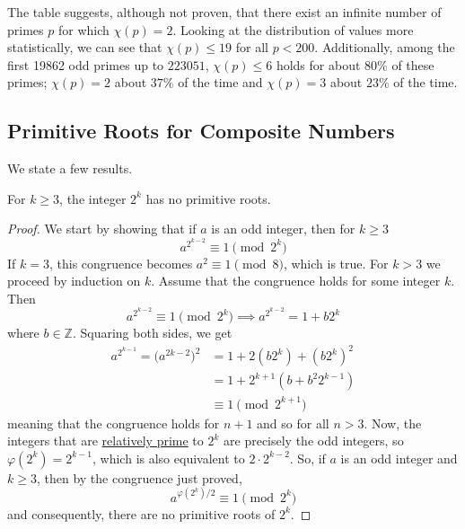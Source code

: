 \documentclass{article}
\newcounter{theorem}[section]
\begin{document}
The table suggests, although not proven, that there exist an infinite number of primes $p$ for which $\chi(p) = 2$. Looking at the distribution of values more statistically, we can see that $\chi(p) \leq 19$ for all $p < 200$. Additionally, among the first 19862 odd primes up to $223051$, $\chi(p) \leq 6$ holds for about $80\%$ of these primes; $\chi(p) = 2$ about $37\%$ of the time and $\chi(p) = 3$ about $23\%$ of the time. 

\subsection{Primitive Roots for Composite Numbers}
We state a few results. 

\begin{theorem}
  \label{thm:2k-has-no-primitive-roots-for-kgeq3}
For $k\geq 3$, the integer $2^k$ has no primitive roots. 
\end{theorem}
\begin{proof}
We start by showing that if $a$ is an odd integer, then for $k\geq 3$ 
\begin{equation}
  a^{2^{k-2}} \equiv 1 \pmod{2^k}
\end{equation}
If $k=3$, this congruence becomes $a^2 \equiv 1 \pmod{8}$, which is true. For $k > 3$ we proceed by induction on $k$. Assume that the congruence holds for some integer $k$. Then 
\begin{equation}
  a^{2^{k-2}} \equiv 1 \pmod{2^k} \implies a^{2^{k-2}} = 1 + b 2^k
\end{equation}
where $b \in \mathbb{Z}$. Squaring both sides, we get
\begin{align*}
    a^{2^{k-1}} = \big(a^{2k-2}\big)^2 & = 1 + 2(b 2^k) + (b2^k)^2 \\
    & = 1 + 2^{k+1} (b + b^2 2^{k-1}) \\
    & \equiv 1 \pmod{2^{k+1}}
\end{align*}
meaning that the congruence holds for $n+1$ and so for all $n>3$. Now, the integers that are \hyperref[def:relatively-prime]{relatively prime} to $2^k$ are precisely the odd integers, so $\varphi(2^k) = 2^{k-1}$, which is also equivalent to $2 \cdot 2^{k-2}$. So, if $a$ is an odd integer and $k\geq 3$, then by the congruence just proved, 
\begin{equation}
  a^{\varphi(2^k)/2} \equiv 1 \pmod{2^k}
\end{equation}
and consequently, there are no primitive roots of $2^k$. 
\end{proof}
\end{document}
